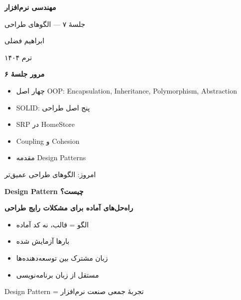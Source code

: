 \documentclass[14pt, a4paper, landscape]{extarticle}
\newcommand{\slide}[1]{%
    \newpage
    \begin{center}
    \begin{minipage}[t]{0.95\textwidth}
    \vspace{0.5cm}
    #1
    \vspace{0.5cm}
    \end{minipage}
    \end{center}
}
\newcommand{\slidetitle}[1]{%
    \begin{center}
        {\LARGE\bfseries\textcolor{primary}{#1}}
    \end{center}
    \vspace{0.5cm}
}
\newcommand{\myaccent}[1]{\textcolor{accent}{#1}}
\begin{document}
\pagestyle{empty}


\begin{center}
    \vspace*{4cm}
    {\color{white}\Huge\bfseries مهندسی نرم‌افزار}
    
    \vspace{1cm}
    
    {\color{accent}\LARGE جلسهٔ ۷ — الگوهای طراحی}
    
    \vspace{2cm}
    
    {\color{white}\Large ابراهیم فضلی}
    
    \vspace{0.5cm}
    
    {\color{white}\large ترم ۱۴۰۴}
\end{center}

\pagestyle{fancy}

\slide{
    \slidetitle{مرور جلسهٔ ۶}
    \vspace{0.5cm}
    \begin{itemize}[itemsep=0.5em]
        \item چهار اصل OOP: Encapsulation, Inheritance, Polymorphism, 
Abstraction
        \item SOLID: پنج اصل طراحی
        \item SRP در HomeStore
        \item Coupling و Cohesion
        \item مقدمه Design Patterns
    \end{itemize}
    \vspace{0.5cm}
    \begin{center}
        {\myaccent{امروز: الگوهای طراحی عمیق‌تر}}
    \end{center}
}

\slide{
    \slidetitle{Design Pattern چیست؟}
    \vspace{0.5cm}
    \begin{center}
        {\large\bfseries راه‌حل‌های آماده برای مشکلات رایج طراحی}
    \end{center}
    \vspace{0.8cm}
    \begin{itemize}[itemsep=0.5em]
        \item {\large الگو = قالب، نه کد آماده}
        \item {\large بارها آزمایش شده}
        \item {\large زبان مشترک بین توسعه‌دهنده‌ها}
        \item {\large مستقل از زبان برنامه‌نویسی}
    \end{itemize}
    \vspace{0.8cm}
    \begin{center}
        {\myaccent{Design Pattern = تجربهٔ جمعی صنعت نرم‌افزار}}
    \end{center}
}
\end{document}
